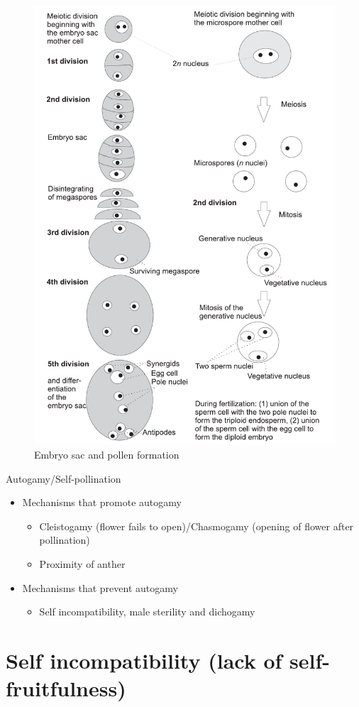 \documentclass[11pt,ignorenonframetext,aspectratio=169]{beamer}
\providecommand{\tightlist}{%
  \setlength{\itemsep}{0pt}\setlength{\parskip}{0pt}}
\begin{document}
\begin{frame}{}
\protect\hypertarget{section-2}{}
\begin{figure}

{\centering \includegraphics[width=0.38\linewidth]{./images/sporogenesis} 

}

\caption{Embryo sac and pollen formation}\label{fig:sporogenesis}
\end{figure}
\end{frame}

\begin{frame}{Autogamy/Self-pollination}
\protect\hypertarget{autogamyself-pollination}{}
\begin{itemize}
\tightlist
\item
  Mechanisms that promote autogamy

  \begin{itemize}
  \tightlist
  \item
    Cleistogamy (flower fails to open)/Chasmogamy (opening of flower
    after pollination)
  \item
    Proximity of anther
  \end{itemize}
\item
  Mechanisms that prevent autogamy

  \begin{itemize}
  \tightlist
  \item
    Self incompatibility, male sterility and dichogamy
  \end{itemize}
\end{itemize}
\end{frame}

\hypertarget{self-incompatibility-lack-of-self-fruitfulness}{%
\section{Self incompatibility (lack of
self-fruitfulness)}\label{self-incompatibility-lack-of-self-fruitfulness}}
\end{document}
